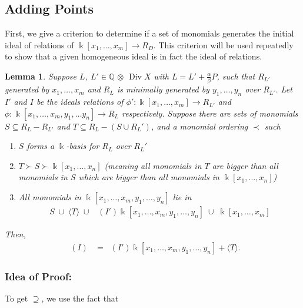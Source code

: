 \documentclass{amsart}
\theoremstyle{plain}
\newtheorem{lem}[thm]{Lemma}
\theoremstyle{definition}
\theoremstyle{remark}
\numberwithin{equation}{section}
\newcommand\ssec{\subsection}
\newcommand\sssec{\subsubsection}
\newcommand\BQ{{\mathbb Q}}
\newcommand\Bk{{\Bbbk}}
\DeclareMathOperator\di{Div}
\newcommand{\halfcan}{L}
\DeclareMathOperator{\initial}{in_\prec}
\begin{document}
\ssec{Adding Points}
\label{ssec:add-points}
First, we give a criterion to determine if a set of monomials generates the initial ideal of relations of $\Bk[x_1, \ldots, x_m] \to R_D$.  This criterion will be used repeatedly to show that a given homogeneous ideal is in fact the ideal of relations.


\begin{lem}
\label{lem:relations_from_generators_induction} 
Suppose $\halfcan$, $\halfcan' \in \BQ$ $\otimes$ $\di X$ with $\halfcan=\halfcan'+\frac{\alpha}{\beta}P$, such that $R_{\halfcan'}$ generated by $x_1, \ldots, x_m$
and $R_{\halfcan}$ is minimally generated by $y_1, \ldots, y_n$ over 
$R_{\halfcan'}$.  Let $I'$ and $I$ be the ideals relations of $\phi':\Bk[x_1, \ldots, x_m]\to R_{\halfcan'}$ and $\phi:\Bk[x_1, \ldots, x_m, y_1, \ldots y_n]\to R_{\halfcan}$ respectively.
Suppose there are sets of monomials $S\subseteq R_\halfcan-R_{\halfcan'}$ and $T\subseteq R_\halfcan-(S\cup R_\halfcan')$, and a monomial ordering $\prec$ such 
\begin{enumerate}
\item $S$ forms a $\Bk$-basis for $R_\halfcan$ over $R_\halfcan'$
\item $T \succ S\succ \Bk[x_1, \ldots, x_n]$ {\rm(}meaning all monomials in $T$ are bigger than all monomials in $S$ which are bigger than all monomials in $\Bk[x_1, \ldots, x_n]${\rm)}
\item All monomials in $\Bk[x_1, \ldots, x_m, y_1, \ldots, y_n]$ lie in 
\begin{align*}
	S \; \cup\; \langle T\rangle \; \cup \; \initial(I') \Bk[x_1, \ldots, x_m, y_1, \ldots, y_n] \; \cup \; \Bk[x_1, \ldots, x_m]
\end{align*}
\end{enumerate}
Then,
\begin{align*}
	\initial(I) & = \initial(I') \Bk[x_1, \ldots, x_m, y_1, \ldots, y_n]
	+ \langle T \rangle.
\end{align*}
\end{lem}

\sssec*{Idea of Proof:} To get $\supseteq$, we use the fact that
\end{document}

